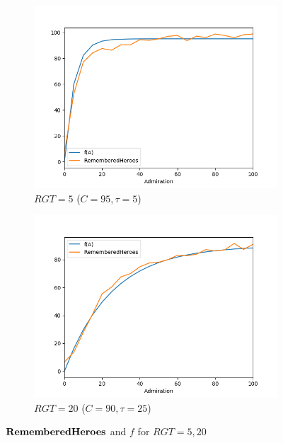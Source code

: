 \documentclass[a4paper,12pt]{report}
\begin{document}
\begin{figure}[h]
    \centering
    \begin{subfigure}[b]{0.4\linewidth} 
        \includegraphics[width=\linewidth]{f_rgt5}
        \caption{$RGT=5$ ($C=95,\tau=5$)}
    \end{subfigure}
    \begin{subfigure}[b]{0.4\linewidth}
        \includegraphics[width=\linewidth]{f_rgt20}
        \caption{$RGT=20$ ($C=90,\tau=25$)}
    \end{subfigure}
    \caption{$\bf{RememberedHeroes}$ and $f$ for $RGT=5, 20$}
    \label{fig:RGT5-20}
    \end{figure}
\end{document}
